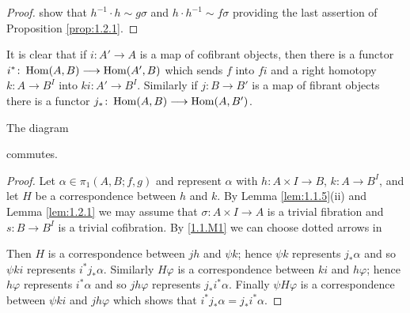 \documentclass[../main]{subfiles}
\begin{document}
\begin{proof}
{    }
    show that $h^{-1} \cdot h \sim g \sigma$ and $h \cdot h^{-1} \sim f \sigma$ providing the last assertion of Proposition \ref{prop:1.2.1}.
\end{proof}
It is clear that if $i \colon A' \longrightarrow A$ is a map of cofibrant objects, then there is a functor $i^* \colon \operatorname{Hom} (A,B) \longrightarrow \operatorname{Hom} (A', B)$ which sends $f$ into $fi$ and a right homotopy $k \colon A \longrightarrow B^I$ into $ki \colon A' \longrightarrow B^I$. Similarly if $j \colon B \longrightarrow B'$ is a map of fibrant objects there is a functor $j_* \colon \operatorname{Hom} (A,B) \longrightarrow \operatorname{Hom}(A,B')$.
\begin{lemma}\label{lem:1.2.3}
    The diagram
    \begin{center}
    \end{center}
    commutes.
\end{lemma}
\begin{proof}
    Let $\alpha \in \pi_1(A,B;f,g)$ and represent $\alpha$ with $h \colon A \times I \longrightarrow B$, $k \colon A \longrightarrow B^I$, and let $H$ be a correspondence between $h$ and $k$. By Lemma \ref{lem:1.1.5}(ii) and Lemma \ref{lem:1.2.1} we may assume that $\sigma \colon A \times I \longrightarrow A$ is a trivial fibration and $s \colon B \longrightarrow B^I$ is a trivial cofibration. By \ref{1.1.M1} we can choose dotted arrows in
    \begin{center}
    \end{center}
    Then $H$ is a correspondence between $jh$ and $\psi k$; hence $\psi k$ represents $j_* \alpha$ and so $\psi k i$ represents $i^* j_* \alpha$. Similarly $H\varphi$ is a correspondence between $ k i$ and $h\varphi$; hence $h\varphi$ represents $i^* \alpha$ and so $jh\varphi$ represents $j_*i^*\alpha$. Finally $\psi H\varphi$ is a correspondence between $\psi ki$ and $jh\varphi$ which shows that $i^* j_* \alpha = j_* i^* \alpha$.
\end{proof}
\end{document}
